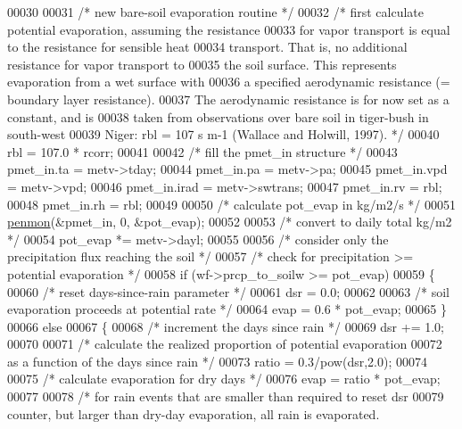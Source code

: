 \begin{DoxyCode}
00030 
00031     \textcolor{comment}{/* new bare-soil evaporation routine */}
00032     \textcolor{comment}{/* first calculate potential evaporation, assuming the resistance}
00033 \textcolor{comment}{    for vapor transport is equal to the resistance for sensible heat}
00034 \textcolor{comment}{    transport.  That is, no additional resistance for vapor transport to}
00035 \textcolor{comment}{    the soil surface. This represents evaporation from a wet surface with}
00036 \textcolor{comment}{    a specified aerodynamic resistance (= boundary layer resistance).}
00037 \textcolor{comment}{    The aerodynamic resistance is for now set as a constant, and is}
00038 \textcolor{comment}{    taken from observations over bare soil in tiger-bush in south-west}
00039 \textcolor{comment}{    Niger: rbl = 107 s m-1 (Wallace and Holwill, 1997). */}
00040     rbl = 107.0 * rcorr;
00041     
00042     \textcolor{comment}{/* fill the pmet\_in structure */}
00043     pmet\_in.ta = metv->tday;
00044     pmet\_in.pa = metv->pa;
00045     pmet\_in.vpd = metv->vpd;
00046     pmet\_in.irad = metv->swtrans;
00047     pmet\_in.rv = rbl;
00048     pmet\_in.rh = rbl;
00049 
00050     \textcolor{comment}{/* calculate pot\_evap in kg/m2/s */}
00051     \hyperlink{canopy__et_8c_a5c8d396ed94c7e0f3f4c80dd3ecd046c}{penmon}(&pmet\_in, 0, &pot\_evap);
00052 
00053     \textcolor{comment}{/* convert to daily total kg/m2 */}
00054     pot\_evap *= metv->dayl;
00055     
00056     \textcolor{comment}{/* consider only the precipitation flux reaching the soil */}
00057     \textcolor{comment}{/* check for precipitation >= potential evaporation */}
00058     \textcolor{keywordflow}{if} (wf->prcp\_to\_soilw >= pot\_evap)
00059     \{
00060         \textcolor{comment}{/* reset days-since-rain parameter */}
00061         dsr = 0.0;
00062         
00063         \textcolor{comment}{/* soil evaporation proceeds at potential rate */}
00064         evap = 0.6 * pot\_evap;
00065     \}
00066     \textcolor{keywordflow}{else}
00067     \{
00068         \textcolor{comment}{/* increment the days since rain */}
00069         dsr += 1.0;
00070         
00071         \textcolor{comment}{/* calculate the realized proportion of potential evaporation}
00072 \textcolor{comment}{        as a function of the days since rain */}
00073         ratio = 0.3/pow(dsr,2.0);
00074         
00075         \textcolor{comment}{/* calculate evaporation for dry days */}
00076         evap = ratio * pot\_evap;
00077         
00078         \textcolor{comment}{/* for rain events that are smaller than required to reset dsr}
00079 \textcolor{comment}{        counter, but larger than dry-day evaporation, all rain is evaporated.}

\end{DoxyCode}
